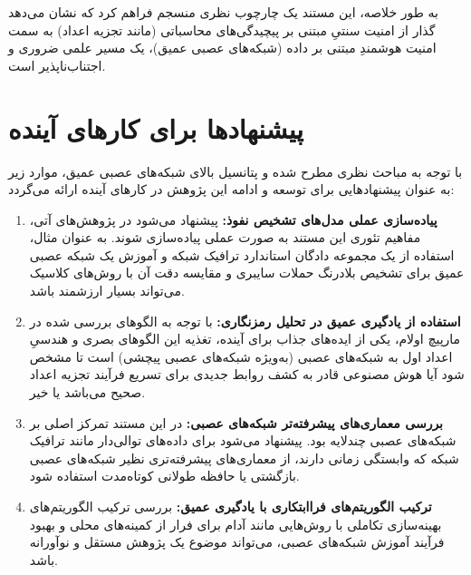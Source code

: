 به طور خلاصه، این مستند یک چارچوب نظری منسجم فراهم کرد که نشان می‌دهد گذار از امنیت سنتیِ مبتنی بر پیچیدگی‌های محاسباتی (مانند تجزیه اعداد) به سمت امنیت هوشمندِ مبتنی بر داده (شبکه‌های عصبی عمیق)، یک مسیر علمی ضروری و اجتناب‌ناپذیر است.

\section{پیشنهادها برای کارهای آینده}\label{sec:5-2}
با توجه به مباحث نظری مطرح شده و پتانسیل بالای شبکه‌های عصبی عمیق، موارد زیر به عنوان پیشنهادهایی برای توسعه و ادامه این پژوهش در کارهای آینده ارائه می‌گردد:

\begin{enumerate}
	\item \textbf{پیاده‌سازی عملی مدل‌های تشخیص نفوذ:} پیشنهاد می‌شود در پژوهش‌های آتی، مفاهیم تئوری این مستند به صورت عملی پیاده‌سازی شوند. به عنوان مثال، استفاده از یک مجموعه دادگان استاندارد ترافیک شبکه و آموزش یک شبکه عصبی عمیق برای تشخیص بلادرنگ حملات سایبری و مقایسه دقت آن با روش‌های کلاسیک می‌تواند بسیار ارزشمند باشد.
	
	\item \textbf{استفاده از یادگیری عمیق در تحلیل رمزنگاری:} با توجه به الگوهای بررسی شده در مارپیچ اولام، یکی از ایده‌های جذاب برای آینده، تغذیه این الگوهای بصری و هندسیِ اعداد اول به شبکه‌های عصبی (به‌ویژه شبکه‌های عصبی پیچشی) است تا مشخص شود آیا هوش مصنوعی قادر به کشف روابط جدیدی برای تسریع فرآیند تجزیه اعداد صحیح می‌باشد یا خیر.
	
	\item \textbf{بررسی معماری‌های پیشرفته‌تر شبکه‌های عصبی:} در این مستند تمرکز اصلی بر شبکه‌های عصبی چندلایه  بود. پیشنهاد می‌شود برای داده‌های توالی‌دار مانند ترافیک شبکه که وابستگی زمانی دارند، از معماری‌های پیشرفته‌تری نظیر شبکه‌های عصبی بازگشتی یا حافظه طولانی کوتاه‌مدت استفاده شود.
	
	\item \textbf{ترکیب الگوریتم‌های فراابتکاری با یادگیری عمیق:} بررسی ترکیب الگوریتم‌های بهینه‌سازی تکاملی با روش‌هایی مانند آدام برای فرار از کمینه‌های محلی و بهبود فرآیند آموزش شبکه‌های عصبی، می‌تواند موضوع یک پژوهش مستقل و نوآورانه باشد.
\end{enumerate}
